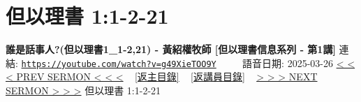 \documentclass{book}
\begin{document}
\section{但以理書 1:1-2-21}
\label{sec:g49XieTOO9Y}
\textbf{誰是話事人?(但以理書1\_1-2,21) - 黃紹權牧師  [但以理書信息系列 - 第1講]}
\newline
\newline
連結: \href{https://youtube.com/watch?v=g49XieTOO9Y}{\texttt{https://youtube.com/watch?v=g49XieTOO9Y}} ~~~~ 語音日期: 2025-03-26
\newline
\newline
\hyperref[sec:2sEF8L92TnY]{< < < PREV SERMON < < <}
~
\hyperlink{toc}{[返主目錄]}
~
\hyperref[ch:preacher18]{[返講員目錄]}
~
\hyperref[sec:nm0yIFofvjE]{> > > NEXT SERMON > > >}
\newline
\newline
但以理書 1:1-2-21
\newline
\end{document}
